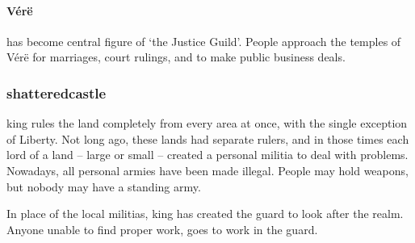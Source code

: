 \begin{multicols}{2}
\paragraph{V\'{e}r\"{e}} has become central figure of `the Justice Guild'.
People approach the temples of V\'{e}r\"{e} for marriages, court rulings, and to make public business deals.

\subsubsection{\Gls{shatteredcastle}}

\Gls{king} rules the land completely from every area at once, with the single exception of Liberty.
Not long ago, these lands had separate rulers, and in those times each lord of a land -- large or small -- created a personal militia to deal with problems.
Nowadays, all personal armies have been made illegal.
People may hold weapons, but nobody may have a standing army.

In place of the local militias, \gls{king} has created the \gls{guard} to look after the realm.
Anyone unable to find proper work, goes to work in the \gls{guard}.

\end{multicols}


